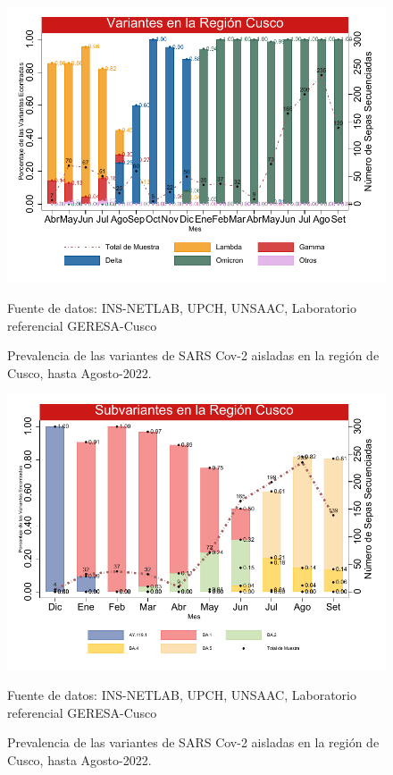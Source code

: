 \documentclass[12pt,a4paper,openany]{book}
\begin{document}
	\begin{figure}[h]
		\caption{Prevalencia de las variantes de SARS Cov-2 aisladas en la región de Cusco, hasta Agosto-2022. }\label{fig:variantes}
		\begin{center}
			\includegraphics[width=0.85\linewidth]{../figuras/variantes.pdf}
		\end{center}
		{\footnotesize {Fuente de datos: INS-NETLAB, UPCH, UNSAAC, Laboratorio referencial GERESA-Cusco}}
	\end{figure}

	\begin{figure}[h]
	\caption{Prevalencia de las variantes de SARS Cov-2 aisladas en la región de Cusco, hasta Agosto-2022. }\label{fig:subvariantes}
	\begin{center}
		\includegraphics[width=0.85\linewidth]{../figuras/subvariantes.pdf}
	\end{center}
	{\footnotesize {Fuente de datos: INS-NETLAB, UPCH, UNSAAC, Laboratorio referencial GERESA-Cusco}}
\end{figure}
	
\end{document}
